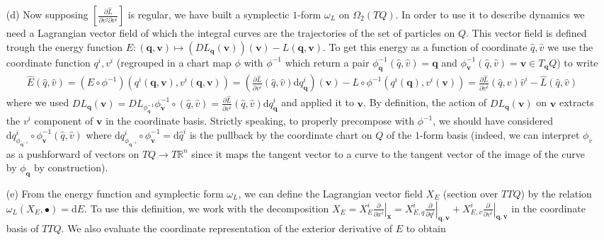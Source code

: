 \documentclass[10pt, a4paper]{article}
\begin{document}
{\begin{enumerate}
  \item[(d)] Now supposing $\left[\frac{\partial \hat{L}}{\partial v^j \partial v^i}\right]$ is regular, we have built a symplectic $1$-form $\omega_L$ on $\Omega_2(TQ)$. In order to use it to describe dynamics we need a Lagrangian vector field of which the integral curves are the trajectories of the set of particles on $Q$. This vector field is defined trough the energy function $E : (\mathbf{q}, \mathbf{v}) \mapsto (DL_{\mathbf{q}}(\mathbf{v}))(\mathbf{v}) - L(\mathbf{q}, \mathbf{v})$. To get this energy as a function of coordinate $\hat{q}, \hat{v}$ we use the coordinate function $q^{i}, v^{i}$ (regrouped in a chart map $\phi$ with $\phi^{-1}$ which return a pair $\phi^{-1}_{\mathbf{q}}(\hat{q}, \hat{v}) = \mathbf{q}$ and $\phi^{-1}_{\mathbf{v}}(\hat{q}, \hat{v}) = \mathbf{v}\in T_{\mathbf{q}}Q$) to write 
  \begin{align*}
    \hat{E}(\hat{q}, \hat{v}) = (E \circ \phi^{-1})(q^{i}(\mathbf{q}, \mathbf{v}), v^{i}(\mathbf{q}, \mathbf{v})) = \left(\frac{\partial \hat{L}}{\partial v^i} (\hat{q}, \hat{v}) \text{d}q^{i}_{\mathbf{q}}\right)(\mathbf{v}) - L\circ \phi^{-1} (q^{i}(\mathbf{q}), v^i(\mathbf{v})) =  \frac{\partial \hat{L}}{\partial v^i} (\hat{q}, \hat{v}) \hat{v}^i - \hat{L}(\hat{q}, \hat{v})
  \end{align*} 
  where we used $DL_{\mathbf{q}}(\mathbf{v}) = DL_{\phi^{-1}_{\mathbf{q}}} \phi^{-1}_{\mathbf{v}}\circ (\hat{q}, \hat{v}) = \frac{\partial \hat{L}}{\partial v^i} (\hat{q}, \hat{v}) \text{d}q^{i}_{\mathbf{q}}$ and applied it to $\mathbf{v}$. By definition, the action of $DL_{\mathbf{q}}(\mathbf{v})$ on $\mathbf{v}$ extracts the $v^i$ component of $\mathbf{v}$ in the coordinate basis. Strictly speaking, to properly precompose with $\phi^{-1}$, we should have considered $\text{d}q^{i}_{\phi_{\mathbf{q}^{-1}}} \circ \phi_\mathbf{v}^{-1}(\hat{q}, \hat{v})$  where $\text{d}q^{i}_{\phi_{\mathbf{q}^{-1}}}\circ \phi_\mathbf{v}^{-1} = \text{d}\hat{q}^i$ is the pullback by the coordinate chart on $Q$ of the $1$-form basis (indeed, we can interpret $\phi_v$ as a pushforward of vectors on $TQ \to T\mathbb{R}^n$ since it maps the tangent vector to a curve to the tangent vector of the image of the curve by $\phi_\mathbf{q}$ by construction).
  \item[(e)] From the energy function and symplectic form $\omega_L$, we can define the Lagrangian vector field $X_E$ (section over $TTQ$) by the relation $\omega_L(X_E, \bullet) = \text{d}E$. To use this definition, we work with the decomposition $X_E = X_E^{i}\left.\frac{\partial}{\partial x^i}\right|_{\mathbf{x}} = X_{E, q}^{i} \left.\frac{\partial}{\partial q^i}\right|_{\mathbf{q}, \mathbf{v}} + X_{E, v}^{i} \left.\frac{\partial}{\partial v^i}\right|_{\mathbf{q}, \mathbf{v}}$ in the coordinate basis of $TTQ$. We also evaluate the coordinate representation of the exterior derivative of $E$ to obtain 

\end{enumerate}}
\end{document}
